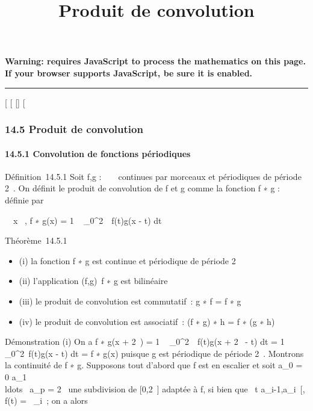 \documentclass[]{article}
\title{Produit de convolution}
\author{}
\date{}
\begin{document}
\maketitle

\textbf{Warning: 
requires JavaScript to process the mathematics on this page.\\ If your
browser supports JavaScript, be sure it is enabled.}

\begin{center}\rule{3in}{0.4pt}\end{center}

{[}
{[}
{[}{]}
{[}

\subsubsection{14.5 Produit de convolution}

\paragraph{14.5.1 Convolution de fonctions périodiques}

Définition~14.5.1 Soit f,g : ~ \rightarrow~  continues par morceaux et périodiques
de période 2\pi~. On définit le produit de convolution de f et g comme la
fonction f ∗ g : ~ \rightarrow~  définie par

\forall~~x \in {}~, f ∗ g(x) = 1 \pi~ \int  \_0^2\pi~~f(t)g(x - t) dt

Théorème~14.5.1

\begin{itemize}
\itemsep1pt\parskip0pt
\item
  (i) la fonction f ∗ g est continue et périodique de période 2\pi~
\item
  (ii) l'application (f,g)\mapsto~f ∗ g est
  bilinéaire
\item
  (iii) le produit de convolution est commutatif~: g ∗ f = f ∗ g
\item
  (iv) le produit de convolution est associatif~: (f ∗ g) ∗ h = f ∗ (g ∗
  h)
\end{itemize}

Démonstration (i) On a f ∗ g(x + 2\pi~) = 1 \pi~
\int  \_0^2\pi~~f(t)g(x + 2\pi~ - t) dt
= 1 \pi~ \int ~
\_0^2\pi~f(t)g(x - t) dt = f ∗ g(x) puisque g est périodique
de période 2\pi~. Montrons la continuité de f ∗ g. Supposons tout d'abord
que f est en escalier et soit a\_0 = 0 \leq a\_1
\leq\\ldots~ \leq
a\_p = 2\pi~ une subdivision de {[}0,2\pi~{]} adaptée à f, si bien que
\forall~t \in{]}a\_i-1,a\_i~{[}, f(t) =
\lambda~\_i~; on a alors
\end{document}
